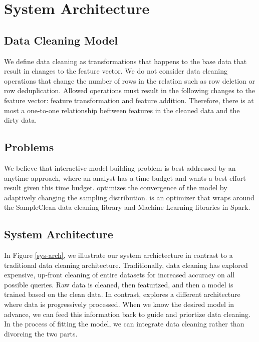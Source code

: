 \section{System Architecture}

\subsection{Data Cleaning Model}
We define data cleaning as transformations that happens to the base data that result in changes to the feature vector. We do not consider data cleaning operations that change the number of rows in the relation such as row deletion or row deduplication. Allowed operations must result in the following changes to the feature vector: feature transformation and feature addition. Therefore, there is at most a one-to-one relationship beftween features in the cleaned data and the dirty data.

\subsection{Problems}
We believe that interactive model building problem is best addressed by an anytime approach, where an analyst has a time budget and wants a best effort result given this time budget.
\sys optimizes the convergence of the model by adaptively changing the sampling distribution.
\sys is an optimizer that wraps around the SampleClean data cleaning library and Machine Learning libraries in Spark.

\begin{problem}
\end{problem}

\begin{problem}
\end{problem}

\begin{problem}
\end{problem}

\subsection{System Architecture}
In Figure \ref{sys-arch}, we illustrate our system archictecture in contrast to a traditional data cleaning architecture.
Traditionally, data cleaning has explored expensive, up-front cleaning of entire datasets for increased accuracy on all possible queries.
Raw data is cleaned, then featurized, and then a model is trained based on the clean data.
In contrast, \sys explores a different architecture where data is progressively processed.
When we know the desired model in advance, we can feed this information back to guide and priortize data cleaning.
In the process of fitting the model, we can integrate data cleaning rather than divorcing the two parts.

